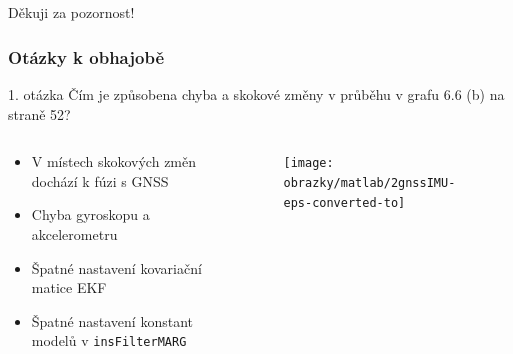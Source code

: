\documentclass[%
  12pt,       				%
	t,                  %
	aspectratio=1610,   %
	unicode,						%
]{beamer}				    	%
\begin{document}
\begin{frame}[c] 
	\frametitle{\mbox{ }}
	\begin{center}
		{\Huge Děkuji za pozornost!}
	\end{center}
\end{frame}

\begin{frame} 
	\frametitle{Otázky k obhajobě}
		\begin{alertblock}{1. otázka}
		Čím je způsobena chyba a skokové změny v průběhu v grafu 6.6 (b) na straně 52?
		\end{alertblock}
		\vspace{1ex}
		\begin{columns}[T] 								%
		\begin{column}{0.5\textwidth}		%
		\begin{itemize}
		\item V místech skokových změn dochází k fúzi s GNSS
		\item Chyba gyroskopu a akcelerometru
		\item Špatné nastavení kovariační matice EKF
		\item Špatné nastavení konstant modelů v \texttt{insFilterMARG}
		\end{itemize}

		\end{column}
		\begin{column}{0.5\textwidth}		%
		\begin{figure}%
		\centering
		\texttt{[image: obrazky/matlab/2gnssIMU-eps-converted-to]}
		\end{figure}
		\end{column}
	\end{columns}	

	
\end{frame} 
\end{document}
